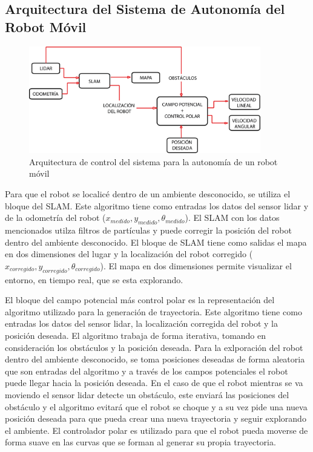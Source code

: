 
\subsection{Arquitectura del Sistema de Autonomía del Robot Móvil}

\begin{figure}%
	\centering \footnotesize
	\includegraphics[width=0.9\textwidth]{images/estruct_auto.png}
	\captionsetup{font=footnotesize}
	\caption{Arquitectura de control del sistema para la autonomía de un robot móvil}
	\label{fig:ArqSist}
\end{figure}
 
Para que el robot se localicé dentro de un ambiente desconocido, se utiliza el bloque del SLAM. 
Este algoritmo tiene como entradas los datos del sensor lidar y de la odometría del robot 
($x_{medido},y_{medido},\theta_{medido}$). El SLAM con los datos mencionados utilza filtros de 
partículas y puede corregir la posición del robot dentro del ambiente desconocido. El 
bloque de SLAM tiene como salidas el mapa en dos dimensiones del lugar y la localización del robot 
corregido ($x_{corregido},y_{corregido},\theta_{corregido}$). El mapa en dos dimensiones permite
visualizar el entorno, en tiempo real, que se esta explorando.

El bloque del campo potencial más control polar es la representación del algoritmo utilizado
para la generación de trayectoria. Este algoritmo tiene como entradas los datos del sensor 
lidar, la localización corregida del robot y la posición deseada. El algoritmo trabaja de forma 
iterativa, tomando en consideración los obstáculos y la posición deseada. Para la exlporación del 
robot dentro del ambiente desconocido, se toma posiciones deseadas de forma aleatoria que son
entradas del algoritmo y a través de los campos potenciales el robot puede llegar hacia la posición 
deseada. En el caso de que el robot mientras se va moviendo el sensor lidar detecte un obstáculo, 
este enviará las posiciones del obstáculo y el algoritmo evitará que el robot se choque y a su vez
pide una nueva posición deseada para que pueda crear una nueva trayectoria y seguir explorando el 
ambiente. El controlador polar es utilizado para que el robot pueda moverse de forma suave en las 
curvas que se forman al generar su propia trayectoria.

